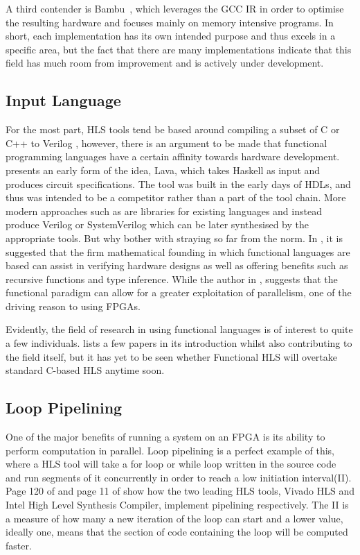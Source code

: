 A third contender is Bambu~\cite{6645550}, which leverages the GCC IR in order to optimise the resulting hardware and focuses mainly on memory intensive programs. In short, each implementation has its own intended purpose and thus excels in a specific area, but the fact that there are many implementations indicate that this field has much room from improvement and is actively under development.

\subsection{Input Language}

For the most part, HLS tools tend be based around compiling a subset of C or C++ to Verilog \cite{7368920}, however, there is an argument to be made that functional programming languages have a certain affinity towards hardware development. \cite{bjesse1998lava} presents an early form of the idea, Lava, which takes Haskell as input and produces circuit specifications. The tool was built in the early days of HDLs, and thus was intended to be a competitor rather than a part of the tool chain. More modern approaches such as \cite{hardcaml} are libraries for existing languages and instead produce Verilog or SystemVerilog which can be later synthesised by the appropriate tools. But why bother with straying so far from the norm. In \cite{7331371}, it is suggested that the firm mathematical founding in which functional languages are based can assist in verifying hardware designs as well as offering benefits such as recursive functions and type inference. While the author in \cite{Edwards2019FHWP}, suggests that the functional paradigm can allow for a greater exploitation of parallelism, one of the driving reason to using FPGAs. 

Evidently, the field of research in using functional languages is of interest to quite a few individuals. \cite{7723553} lists a few papers in its introduction whilst also contributing to the field itself, but it has yet to be seen whether Functional HLS will overtake standard C-based HLS anytime soon.

\subsection{Loop Pipelining}

One of the major benefits of running a system on an FPGA is its ability to perform computation in parallel. Loop pipelining is a perfect example of this, where a HLS tool will take a for loop or while loop written in the source code and run segments of it concurrently in order to reach a low initiation interval(II). Page 120 of \cite{vivado-optmisation-manual} and page 11 of \cite{intel-hls-manual} show how the two leading HLS tools, Vivado HLS and Intel High Level Synthesis Compiler, implement pipelining respectively. The II is a measure of how many a new iteration of the loop can start and a lower value, ideally one, means that the section of code containing the loop will be computed faster. 

